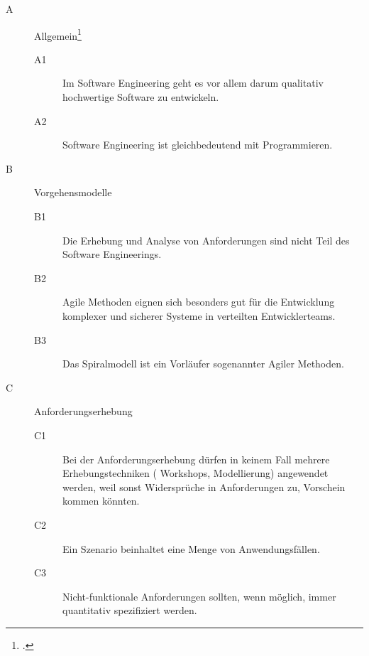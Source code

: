 \documentclass{bschlangaul-aufgabe}
\begin{document}
\begin{description}

%

\item[A] Allgemein\footcite[Thema 2 Teilaufgabe 2 Aufgabe 1]{examen:66116:2016:09}

\begin{description}
\item[A1] Im Software Engineering
geht es vor allem darum qualitativ hochwertige Software zu entwickeln.

\item[A2] Software Engineering ist gleichbedeutend mit
Programmieren.
\end{description}

%

\item[B] Vorgehensmodelle

\begin{description}
\item[B1] Die Erhebung und Analyse von Anforderungen sind nicht Teil des
Software Engineerings.

\item[B2] Agile Methoden eignen sich besonders gut
für die Entwicklung komplexer und sicherer Systeme in verteilten
Entwicklerteams.

\item[B3] Das Spiralmodell ist ein Vorläufer
sogenannter Agiler Methoden.
\end{description}

%

\item[C] Anforderungserhebung

\begin{description}
\item[C1] Bei der Anforderungserhebung dürfen in keinem Fall mehrere
Erhebungstechniken (\zB{} Workshops, Modellierung) angewendet werden,
weil sonst Widersprüche in Anforderungen zu, Vorschein kommen könnten.

\item[C2] Ein Szenario beinhaltet eine Menge von Anwendungsfällen.

\item[C3] Nicht-funktionale Anforderungen sollten, wenn möglich, immer quantitativ spezifiziert
werden.
\end{description}


\end{description}
\end{document}
